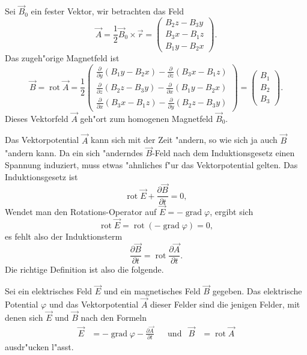 \begin{beispiel}
Sei $\vec B_0$ ein fester Vektor, wir betrachten das Feld
\[
\vec A=\frac12\vec B_0\times \vec r=\begin{pmatrix}
B_2z-B_3y\\
B_3x-B_1z\\
B_1y-B_2x
\end{pmatrix}.
\]
Das zugeh"orige Magnetfeld ist
\begin{equation}
\vec B
=
\operatorname{rot}\vec A
=
\frac12
\begin{pmatrix}
\frac{\partial}{\partial y}(B_1y-B_2x)-\frac{\partial}{\partial z}(B_3x-B_1z)\\
\frac{\partial}{\partial z}(B_2z-B_3y)-\frac{\partial}{\partial x}(B_1y-B_2x)\\
\frac{\partial}{\partial x}(B_3x-B_1z)-\frac{\partial}{\partial y}(B_2z-B_3y)
\end{pmatrix}
=
\begin{pmatrix}
B_1\\B_2\\B_3
\end{pmatrix}.
\end{equation}
Dieses Vektorfeld $\vec A$ geh"ort zum homogenen Magnetfeld $\vec B_0$.
\end{beispiel}

Das Vektorpotential $\vec A$ kann sich mit der Zeit "andern, so wie sich
ja auch $\vec B$ "andern kann.
Da ein sich "anderndes $\vec B$-Feld nach dem Induktionsgesetz einen
Spannung induziert, muss etwas "ahnliches f"ur das Vektorpotential gelten.
Das Induktionsgesetz ist
\[
\operatorname{rot}\vec E +\frac{\partial\vec B}{\partial t}=0,
\]
Wendet man den Rotations-Operator auf
$\vec E = -\operatorname{grad}\varphi$, ergibt sich
\[
\operatorname{rot}\vec E=\operatorname{rot}(-\operatorname{grad}\varphi)=0,
\]
es fehlt also der Induktionsterm
\[
\frac{\partial\vec B}{\partial t}
=
\operatorname{rot}\frac{\partial\vec A}{\partial t}.
\]
Die richtige Definition ist also die folgende.

\begin{definition}
Sei ein elektrisches Feld $\vec E$ und ein magnetisches Feld $\vec B$
gegeben.
Das elektrische Potential $\varphi$ und das Vektorpotential $\vec A$ 
dieser Felder sind die jenigen Felder, mit denen sich $\vec E$ und $\vec B$
nach den Formeln
\begin{equation}
\begin{aligned}
\vec E
&=
-\operatorname{grad}\varphi
-\frac{\partial\vec A}{\partial t}
&&\text{und}&
\vec B
&=
\operatorname{rot}\vec A
\end{aligned}
\label{skript:potentiale}
\end{equation}
ausdr"ucken l"asst.
\end{definition}



